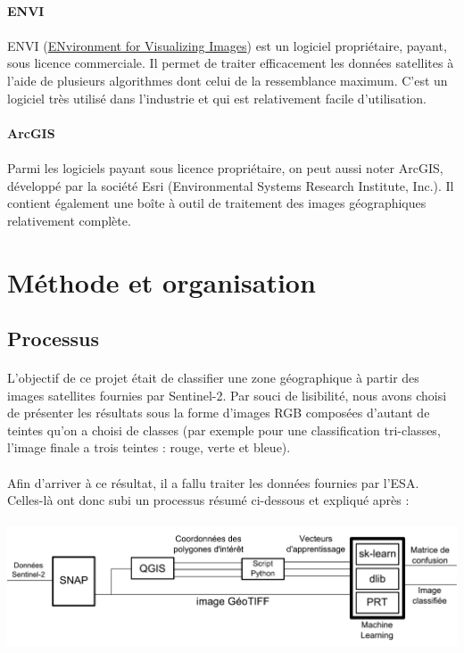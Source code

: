 \documentclass[a4paper,10pt]{article}
\begin{document}
\paragraph{ENVI}
\paragraph{}
ENVI ({\href{http://www.exelisvis.fr/ProduitsetServices/LesproduitsENVI/ENVI.aspx}{ENvironment for Visualizing Images}}) est un logiciel propriétaire, payant, sous licence commerciale. Il permet de traiter efficacement les données satellites à l'aide de plusieurs algorithmes dont celui de la ressemblance maximum. C'est un logiciel très utilisé dans l'industrie et qui est relativement facile d'utilisation.
\paragraph{ArcGIS}
\paragraph{}
Parmi les logiciels payant sous licence propriétaire, on peut aussi noter ArcGIS, développé par la société Esri (Environmental Systems Research Institute, Inc.). Il contient également une boîte à outil de traitement des images géographiques relativement complète.

\section{Méthode et organisation}
\subsection{Processus}
\paragraph{}
L'objectif de ce projet était de classifier une zone géographique à partir des images satellites fournies par Sentinel-2. Par souci de lisibilité, nous avons choisi de présenter les résultats sous la forme d'images RGB composées d'autant de teintes qu'on a choisi de classes (par exemple pour une classification tri-classes, l'image finale a trois teintes : rouge, verte et bleue).
\paragraph{}
Afin d'arriver à ce résultat, il a fallu traiter les données fournies par l'ESA. Celles-là ont donc subi un processus résumé ci-dessous et expliqué après : \\\\
\includegraphics[scale=0.3]{process_Multispec.pdf}
\end{document}
